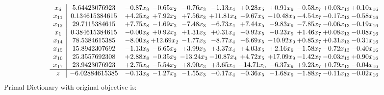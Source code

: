 \documentclass[9pt]{article}
\begin{document}
\[\begin{array}{c| c c@{\hskip 2pt} c@{\hskip 2pt} c@{\hskip 2pt} c@{\hskip 2pt} c@{\hskip 2pt} c@{\hskip 2pt} c@{\hskip 2pt} c@{\hskip 2pt} c@{\hskip 2pt} }
 x_{6}   &  5.64423076923 & -0.87 x_{8} & -0.65 x_{2} & -0.76 x_{3} & -1.13 x_{4} & +  0.28 x_{5} & +  0.91 x_{9} & -0.58 x_{7} & +  0.03 x_{13} & +  0.10 x_{16}\\
 x_{11}   &  0.134615384615 & +  4.25 x_{8} & +  7.92 x_{2} & +  7.56 x_{3} & + 11.81 x_{4} & -9.67 x_{5} & -10.48 x_{9} & -4.54 x_{7} & -0.17 x_{13} & -0.58 x_{16}\\
 x_{12}   &  29.7115384615 & +  7.75 x_{8} & -1.69 x_{2} & -7.48 x_{3} & -6.73 x_{4} & +  7.44 x_{5} & -9.83 x_{9} & -7.85 x_{7} & -0.06 x_{13} & -0.19 x_{16}\\
 x_{1}   &  0.384615384615 & -0.00 x_{8} & +  0.92 x_{2} & +  1.31 x_{3} & +  0.31 x_{4} & -0.92 x_{5} & -0.23 x_{9} & +  1.46 x_{7} & +  0.08 x_{13} & -0.08 x_{16}\\
 x_{14}   &  78.5384615385 & -8.00 x_{8} & + 12.69 x_{2} & -1.77 x_{3} & -8.77 x_{4} & -6.69 x_{5} & -10.92 x_{9} & +  0.85 x_{7} & +  0.31 x_{13} & -0.31 x_{16}\\
 x_{15}   &  15.8942307692 & -1.13 x_{8} & -6.65 x_{2} & +  3.99 x_{3} & +  3.37 x_{4} & +  4.03 x_{5} & +  2.16 x_{9} & -1.58 x_{7} & -0.72 x_{13} & -0.40 x_{16}\\
 x_{10}   &  25.3557692308 & +  2.88 x_{8} & -0.35 x_{2} & -13.24 x_{3} & -10.87 x_{4} & +  4.72 x_{5} & + 17.09 x_{9} & -1.42 x_{7} & -0.03 x_{13} & +  0.90 x_{16}\\
 x_{17}   &  23.9423076923 & +  2.75 x_{8} & -5.54 x_{2} & +  8.90 x_{3} & +  3.65 x_{4} & -14.71 x_{5} & -6.37 x_{9} & +  9.23 x_{7} & +  0.79 x_{13} & -0.04 x_{16}\\
\hline
z    &  -6.02884615385 & -0.13 x_{8} & -1.27 x_{2} & -1.55 x_{3} & -0.17 x_{4} & -0.36 x_{5} & -1.68 x_{9} & -1.88 x_{7} & -0.11 x_{13} & -0.02 x_{16}\\
\end{array}\]
Primal Dictionary with original objective is:
\end{document}
